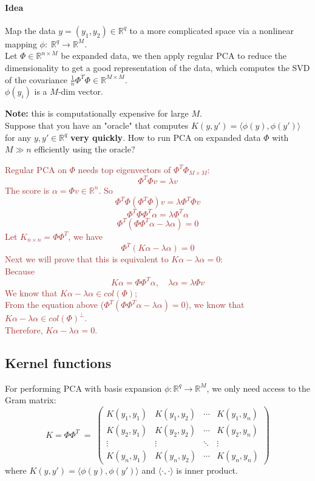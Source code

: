 \documentclass[12pt]{book}
\theoremstyle{definition}
\theoremstyle{remark}
\newcommand{\R}{\mathbb{R}}
\begin{document}
\paragraph{Idea} Map the data $y = (y_1, y_2)\in \R^q$ to a more complicated space via a nonlinear mapping $\phi: \;\R^q \rightarrow\R^M$. \\
Let $\Phi \in \R^{n\times M}$ be expanded data, we then apply regular PCA to reduce the dimensionality to get a good representation of the data, which computes the SVD of the covariance $\frac1n \Phi^T\Phi \in \R^{M\times M}$.\\
$\phi(y_i)$ is a $M$-dim vector.

\textbf{Note: } this is computationally expensive for large $M$.\\



Suppose that you have an "oracle" that computes $K(y,y') = \langle\phi(y),\phi(y')\rangle$ for any $y,y'\in\R^q$ \textbf{very quickly}. How to run PCA on expanded data $\Phi$ with $M\gg n$ efficiently using the oracle?\label{here}

\textcolor{brown}{
Regular PCA on $\Phi$ needs top eigenvectors of $\Phi^T\Phi_{M\times M}$:\\
\[\Phi^T\Phi v=\lambda v\]
The score is $\alpha = \Phi v \in \R^n$.
So
\[\Phi^T\Phi (\Phi^T\Phi)v=\lambda\Phi^T\Phi v\]
\[\Phi^T\Phi\Phi^T\alpha = \lambda\Phi^T\alpha\]
\[\Phi^T(\Phi\Phi^T\alpha - \lambda\alpha) = 0\]
Let $K_{n\times n} = \Phi\Phi^T$, we have
\[\Phi^T(K\alpha - \lambda\alpha) = 0\]
Next we will prove that this is equivalent to $K\alpha - \lambda\alpha = 0$:\\
Because
\[K\alpha = \Phi\Phi^T\alpha, \quad \lambda \alpha = \lambda \Phi v\]
We know that $K\alpha - \lambda \alpha\in col(\Phi)$;\\
From the equation above ($\Phi^T(\Phi\Phi^T\alpha - \lambda\alpha) = 0$), we know that $K\alpha - \lambda \alpha\in col(\Phi)^\perp$.\\
Therefore, $K\alpha - \lambda\alpha=0$.
}

\subsection{Kernel functions}
For performing PCA with basis expansion $\phi: \mathbb{R}^q \to \mathbb{R}^M$, we only need access to the Gram matrix:
  \[
    K = \Phi \Phi^T \;=\;
    \begin{pmatrix}
      K(y_1, y_1) & K(y_1, y_2) & \cdots & K(y_1, y_n) \\
      K(y_2, y_1) & K(y_2, y_2) & \cdots & K(y_2, y_n) \\
      \vdots       & \vdots     & \ddots & \vdots     \\
      K(y_n, y_1) & K(y_n, y_2) & \cdots & K(y_n, y_n)
    \end{pmatrix}
  \]
  where $K(y, y') = \langle \phi(y), \phi(y') \rangle$ and $\langle\cdot,\cdot\rangle$ is inner product. \\
\end{document}
